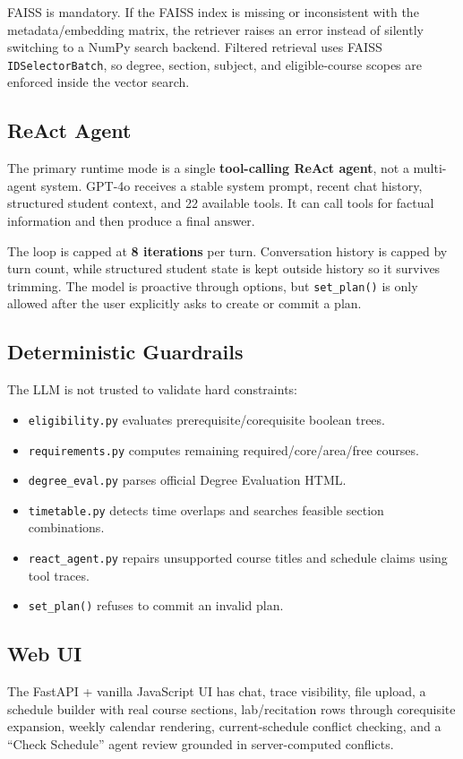 \documentclass[10pt,letterpaper]{article}
\newcommand{\code}[1]{\texttt{#1}}
\begin{document}
FAISS is mandatory. If the FAISS index is missing or inconsistent with the metadata/embedding matrix, the retriever raises an error instead of silently switching to a NumPy search backend. Filtered retrieval uses FAISS \code{IDSelectorBatch}, so degree, section, subject, and eligible-course scopes are enforced inside the vector search.

\subsection{ReAct Agent}
The primary runtime mode is a single \textbf{tool-calling ReAct agent}, not a multi-agent system. GPT-4o receives a stable system prompt, recent chat history, structured student context, and 22 available tools. It can call tools for factual information and then produce a final answer.

The loop is capped at \textbf{8 iterations} per turn. Conversation history is capped by turn count, while structured student state is kept outside history so it survives trimming. The model is proactive through options, but \code{set\_plan()} is only allowed after the user explicitly asks to create or commit a plan.

\subsection{Deterministic Guardrails}
The LLM is not trusted to validate hard constraints:
\begin{itemize}
  \item \code{eligibility.py} evaluates prerequisite/corequisite boolean trees.
  \item \code{requirements.py} computes remaining required/core/area/free courses.
  \item \code{degree\_eval.py} parses official Degree Evaluation HTML.
  \item \code{timetable.py} detects time overlaps and searches feasible section combinations.
  \item \code{react\_agent.py} repairs unsupported course titles and schedule claims using tool traces.
  \item \code{set\_plan()} refuses to commit an invalid plan.
\end{itemize}

\subsection{Web UI}
The FastAPI + vanilla JavaScript UI has chat, trace visibility, file upload, a schedule builder with real course sections, lab/recitation rows through corequisite expansion, weekly calendar rendering, current-schedule conflict checking, and a ``Check Schedule'' agent review grounded in server-computed conflicts.
\end{document}
